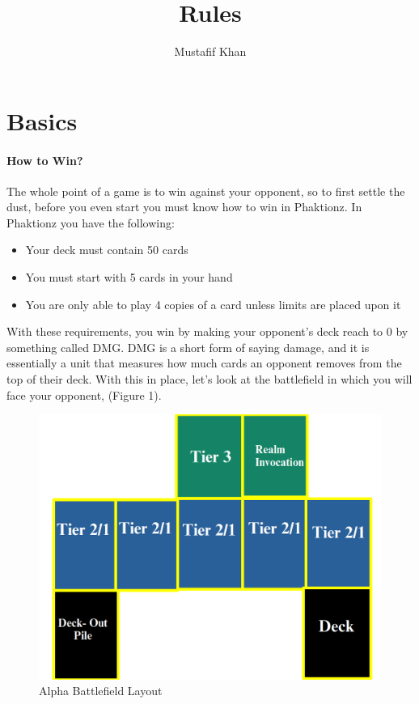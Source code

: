 \documentclass[12pt, letterpaper]{article}
\title{Rules}
\author{Mustafif Khan}
\begin{document}
\maketitle
{}
\newpage
\tableofcontents
\newpage
\section{Basics}
\paragraph{How to Win? \\}
The whole point of a game is to win against your opponent, so to first settle the dust, before you even start you must know how to win 
in Phaktionz. In Phaktionz you have the following: 
\begin{itemize}
    \item Your deck must contain 50 cards
    \item You must start with 5 cards in your hand
    \item You are only able to play 4 copies of a card unless limits are placed upon it
\end{itemize}
With these requirements, you win by making your opponent's deck reach to 0 by something called DMG. DMG is a short form of saying 
damage, and it is essentially a unit that measures how much cards an opponent removes from the top of their deck. With this in place, 
let's look at the battlefield in which you will face your opponent, (Figure 1). 

\begin{center}
    \begin{figure} 
    \includegraphics[scale=0.27]{images/field.png}
    \caption{Alpha Battlefield Layout}
\end{figure}
\end{center}
\end{document}
